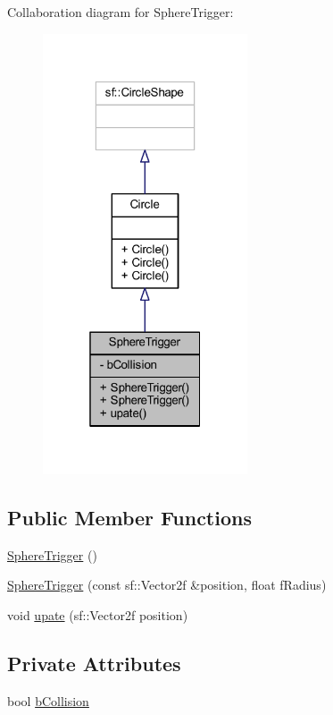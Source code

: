 Collaboration diagram for Sphere\+Trigger\+:\nopagebreak
\begin{figure}[H]
\begin{center}
\leavevmode
\includegraphics[width=172pt]{class_sphere_trigger__coll__graph}
\end{center}
\end{figure}
\subsection*{Public Member Functions}
\begin{DoxyCompactItemize}
\item 
\hyperlink{class_sphere_trigger_a4eddf434bac94055d32b0c5e37b24e0a}{Sphere\+Trigger} ()
\item 
\hyperlink{class_sphere_trigger_ac7dfa0626d77354df9e99dcfc23023ec}{Sphere\+Trigger} (const sf\+::\+Vector2f \&position, float f\+Radius)
\item 
void \hyperlink{class_sphere_trigger_af87f09551c86121cec4c9b0210de6166}{upate} (sf\+::\+Vector2f position)
\end{DoxyCompactItemize}
\subsection*{Private Attributes}
\begin{DoxyCompactItemize}
\item 
bool \hyperlink{class_sphere_trigger_aa2bbb652a3072e2041c75c01705486b9}{b\+Collision}
\end{DoxyCompactItemize}


